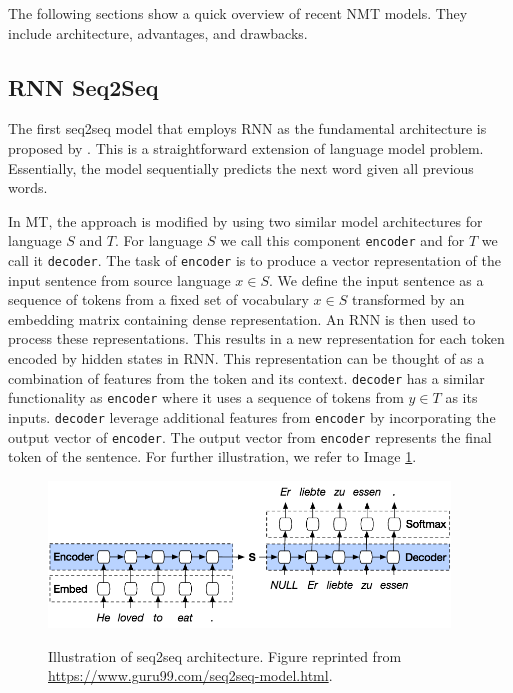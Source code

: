 The following sections show a quick overview of recent NMT models. They include architecture, advantages, and drawbacks.

\subsection{RNN Seq2Seq}
The first seq2seq model that employs RNN as the fundamental architecture is proposed by \cite{sutskever2014sequence}. This is a straightforward extension of language model problem. Essentially, the model sequentially predicts the next word given all previous words.

In MT, the approach is modified by using two similar model architectures for language $S$ and $T$. For language $S$ we call this component \texttt{encoder} and for $T$ we call it \texttt{decoder}.
The task of \texttt{encoder} is to produce a vector representation of the input sentence from source language $x \in S$. We define the input sentence as a sequence of tokens from a fixed set of vocabulary $x \in S$ transformed by an embedding matrix containing dense representation. An RNN is then used to process these representations. This results in a new representation for each token encoded by hidden states in RNN. This representation can be thought of as a combination of features from the token and its context.
\texttt{decoder} has a similar functionality as \texttt{encoder} where it uses a sequence of tokens from $y \in T$ as its inputs. \texttt{decoder} leverage additional features from \texttt{encoder} by incorporating the output vector of \texttt{encoder}. The output vector from \texttt{encoder} represents the final token of the sentence. For further illustration, we refer to Image \ref{img:rnnseq2seq}.

\begin{figure}[h]
    {\includegraphics[width=0.95\textwidth]{img/rnnseq2seq.png}}
    \centering
    \caption{Illustration of seq2seq architecture. Figure reprinted from \protect\url{https://www.guru99.com/seq2seq-model.html}.}
    \label{img:rnnseq2seq}
\end{figure}

